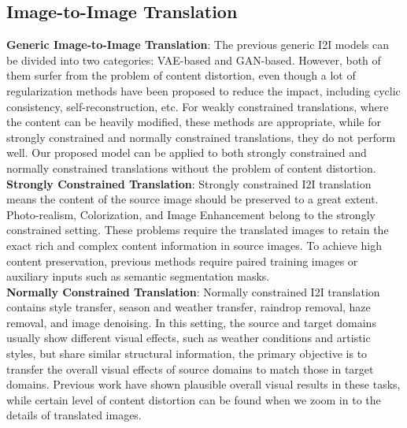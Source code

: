\documentclass[runningheads]{llncs}
\begin{document}
\subsection{Image-to-Image Translation}
\noindent\textbf{Generic Image-to-Image Translation}: The previous generic I2I models can be divided into two categories: VAE-based\cite{ma2018exemplar,zhu2017multimodal,lee2018diverse,liu2017unsupervised,huang2018multimodal,wu2019transgaga} and GAN-based\cite{park2020contrastive,zhu2017unpaired,kim2017learning,yi2017dualgan,chen2020reusing}. However, both of them surfer from the problem of content distortion, even though a lot of regularization methods have been proposed to reduce the impact, including cyclic consistency, self-reconstruction, etc. For weakly constrained translations, where the content can be heavily modified, these methods are appropriate, while for strongly constrained and normally constrained translations, they do not perform well. Our proposed model can be applied to both strongly constrained and normally constrained translations without the problem of content distortion.\\[1ex]
\noindent\textbf{Strongly Constrained Translation}: Strongly constrained I2I translation means the content of the source image should be preserved to a great extent. Photo-realism\cite{richter2021enhancing,hoffman2018cycada,cherian2019sem}, Colorization\cite{kumar2021colorization,deshpande2017learning,guadarrama2017pixcolor,cao2017unsupervised}, and Image Enhancement\cite{lore2017llnet,wei2018deep,jiang2021enlightengan} belong to the strongly constrained setting. These problems require the translated images to retain the exact rich and complex content information in source images. To achieve high content preservation, previous methods require paired training images or auxiliary inputs such as semantic segmentation masks.\\[1ex]
\noindent\textbf{Normally Constrained Translation}: Normally constrained I2I translation contains style transfer\cite{gatys2015texture,huang2017arbitrary,sheng2018avatar,gu2018arbitrary,wang2020diversified,chen2016fast,li2017universal,an2020ultrafast}, season and weather transfer\cite{li2021weather}, raindrop removal\cite{qian2018attentive,shao2021selective}, haze removal\cite{engin2018cycle,anvari2020dehaze,fahim2021single}, and image denoising\cite{guo2019toward,shan2019residual,lehtinen2018noise2noise}. In this setting, the source and target domains usually show different visual effects, such as weather conditions and artistic styles, but share similar structural information, the primary objective is to transfer the overall visual effects of source domains to match those in target domains. Previous work have shown plausible overall visual results in these tasks, while certain level of content distortion can be found when we zoom in to the details of translated images.\\[1ex]
\end{document}

